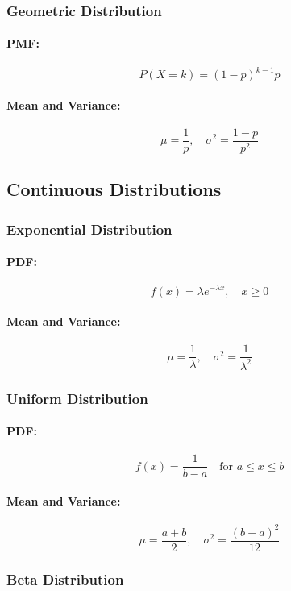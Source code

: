 \documentclass[8pt, a4paper, landscape, includeheadfoot]{extarticle}
\begin{document}
\begin{multicols*}{4}
	\subsubsection{Geometric Distribution}{}
	\paragraph{PMF:}
	$$
		P(X = k) = (1-p)^{k-1} p
	$$
	\paragraph{Mean and Variance:}
	$$
		\mu = \frac{1}{p}, \quad \sigma^2 = \frac{1 - p}{p^2}
	$$

	\subsection{Continuous Distributions}

	\subsubsection{Exponential Distribution}{}
	\paragraph{PDF:}
	$$
		f(x) = \lambda e^{-\lambda x}, \quad x \geq 0
	$$
	\paragraph{Mean and Variance:}
	$$
		\mu = \frac{1}{\lambda}, \quad \sigma^2 = \frac{1}{\lambda^2}
	$$

	\subsubsection{Uniform Distribution}{}
	\paragraph{PDF:}
	$$
		f(x) = \frac{1}{b - a} \quad \text{for } a \leq x \leq b
	$$
	\paragraph{Mean and Variance:}
	$$
		\mu = \frac{a + b}{2}, \quad \sigma^2 = \frac{(b - a)^2}{12}
	$$

	\subsubsection{Beta Distribution}{}

\end{multicols*}
\end{document}
